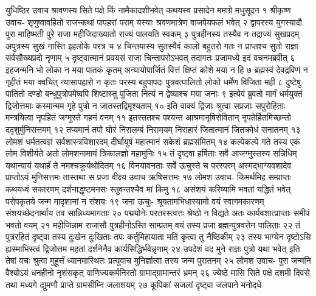 
युधिष्ठिर उवाच
श्रावणस्य सिते पक्षे किं नामैकादशीभवेत् 
कथयस्व प्रसादेन ममाग्रे मधुसूदन १
श्रीकृष्ण उवाच-
शृणुष्वावहितो राजन्कथां पापहरां पराम् 
यस्याः श्रवणमात्रेण वाजपेयफलं भवेत् २
द्वापरस्य युगस्यादौ पुरा माहिष्मती पुरे 
राजा महीजिदाख्यातो राज्यं पालयति स्वकम् ३
पुत्रहीनस्य तस्यैव न तद्राज्यं सुखप्रदम् 
अपुत्रस्य सुखं नास्ति इहलोके परत्र च ४
चिन्तयास्य सुतस्यैवं कालो बहुतरो गतः 
न प्राप्तश्च सुतो राज्ञा सर्वसौख्यप्रदो नृणाम् ५
दृष्ट्वात्मानं प्रवयसं राजा चिन्तापरोऽभवत् 
तदागतः प्रजामध्ये इदं वचनमब्रवीत् ६
इहजन्मनि भो लोका न मया पातकं कृतम् 
अन्यायोपार्जितं वित्तं क्षिप्तं कोशे मया न हि ७
ब्रह्मस्वं देवद्रविणं न गृहीतं मया क्वचित् 
न्यासापहारो न कृतः परस्य बहुपापदः 
पुत्रवत्पालितो लोको धर्मेण विजिता मही ८
दुष्टेषु पातितो दण्डो बन्धुपुत्रोपमेष्वपि 
शिष्टास्तु पूजिता नित्यं न द्वेष्याश्च मया जनाः ९
इत्येवं ब्रुवतो मार्गं धर्मयुक्तं द्विजोत्तमाः 
कस्मान्मम गृहे पुत्रो न जातस्तद्विमृश्यताम् १०
इति वाक्यं द्विजाः श्रुत्वा सप्रजाः सपुरोहिताः 
मन्त्रयित्वा नृपहितं जग्मुस्ते गहनं वनम् ११
इतस्ततश्च पश्यन्त आश्रमानृषिसेवितान् 
नृपतेर्हितमिच्छन्तो ददृशुर्मुनिसत्तमम् १२
तप्यमानं तपो घोरं निरालम्बं निरामयम् 
निराहारं जितात्मानं जितक्रोधं सनातनम् १३
लोमशं धर्मतत्वज्ञं सर्वशास्त्रविशारदम् 
दीर्घायुषं महात्मानं सकेशं ब्रह्मसंमितम् १४
कल्पेकल्पे गते तस्य एकं लोम विशीर्यते 
अतो लोमशनामायं त्रिकालज्ञो महामुनिः १५
तं दृष्ट्वा हर्षिताः सर्वे आजग्मुस्तस्य सन्निधिम् 
यथान्यायं यथार्हं ते नमश्चक्रुर्यथोदितम् १६
विनयावनताः सर्वे ऊचुस्ते च परस्परम् 
अस्मद्भाग्यवशादेव प्राप्तोऽयं मुनिसत्तमः 
तास्तथा स प्रजा वीक्ष्य उवाच ऋषिसत्तमः १७
लोमश उवाच-
किमर्थमिह सम्प्राप्तः कथयध्वं सकारणम् 
दर्शनाद्धृष्टमनसः स्तुवन्तश्चैव मां किमु १८
असंशयं करिष्यामि भवतां यद्धितं भवेत् 
परोपकृतये जन्म मादृशानां न संशयः १९
जना ऊचुः-
श्रूयतामभिधास्यामो वयं स्वागमकारणम् 
संशयच्छेदनार्थाय तव सान्निध्यमागताः २०
पद्मयोनेः परतरस्त्वत्तः श्रेष्ठो न विद्यते 
अतः कार्यवशात्प्राप्ताः समीपं भवतो वयम् २१
महीजिन्नाम राजासौ पुत्रहीनोऽस्ति साम्प्रतम् 
वयं तस्य प्रजा ब्रह्मन्पुत्रवत्तेन पालिताः २२
तं पुत्ररहितं दृष्ट्वा तस्य दुःखेन दुःखिताः 
तपः कर्तुमिहायाता मतिं कृत्वा तु नैष्ठिकीम् २३
तस्य भाग्येन दृष्टोऽसि ह्यस्माभिस्त्वं द्विजोत्तम 
महतां दर्शनेनैव कार्यसिद्धिर्भवेन्नृणाम् २४
उपदेशं वद मुने राज्ञः पुत्रो यथा भवेत् 
इति तेषां वचः श्रुत्वा मुहूर्त्तं ध्यानमास्थितः 
प्रत्युवाच मुनिर्ज्ञात्वा तस्य जन्म पुरातनम् २५
लोमश उवाच-
पुरा जन्मनि वैश्योऽयं धनहीनो नृशंसकृत् 
वाणिज्यकर्मनिरतो ग्रामाद्ग्रामान्तरं भ्रमन् २६
ज्येष्ठे मासि सिते पक्षे दशमी दिवसे तथा 
मध्यगे द्युमणौ प्राप्ते ग्रामसीम्नि जलाशयम् २७
कूपिकां सजलां दृष्ट्वा जलपाने मनोदधे 
